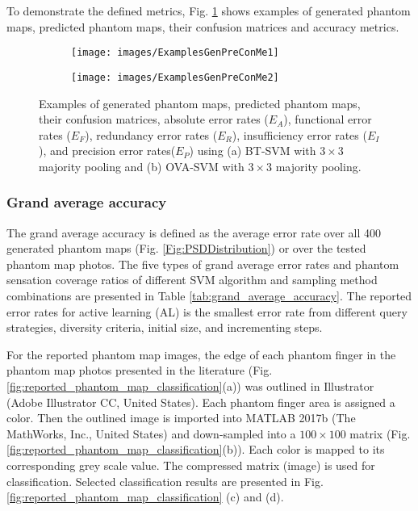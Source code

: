 To demonstrate the defined metrics, Fig. \ref{fig:ExamplesRealPredictedConfMat} shows examples of generated phantom maps, predicted phantom maps, their confusion matrices and accuracy metrics.

\begin{figure}[htbp]
    \centering
    \begin{subfigure}[b]{0.43\textwidth}
        \texttt{[image: images/ExamplesGenPreConMe1]}
        \caption{}
    \end{subfigure}
    \begin{subfigure}[b]{0.43\textwidth}
        \texttt{[image: images/ExamplesGenPreConMe2]}
        \caption{}
    \end{subfigure}
    \caption{Examples of generated phantom maps, predicted phantom maps, their confusion matrices, absolute error rates ($E_A$), functional error rates ($E_F$), redundancy error rates ($E_R$), insufficiency error rates ($E_I$), and precision error rates($E_P$) using (a) BT-SVM with $3 \times 3$ majority pooling and (b) OVA-SVM with $3 \times 3$ majority pooling. }
    \label{fig:ExamplesRealPredictedConfMat}
\end{figure} 
 


\subsubsection{Grand average accuracy}
\label{chap2:subsubsec:grand_average_accuracy}
The grand average accuracy is defined as the average error rate over all 400 generated phantom maps (Fig. \ref{Fig:PSDDistribution}) or over the tested phantom map photos. The five types of grand average error rates and phantom sensation coverage ratios of different SVM algorithm and sampling method combinations are presented in Table \ref{tab:grand_average_accuracy}. The reported error rates for active learning (AL) is the smallest error rate from different query strategies, diversity criteria, initial size, and incrementing steps.  

For the reported phantom map images, the edge of each phantom finger in the phantom map photos presented in the literature (Fig. \ref{fig:reported_phantom_map_classification}(a)) was outlined in Illustrator (Adobe Illustrator CC, United States). Each phantom finger area is assigned a color. Then the outlined image is imported into MATLAB 2017b (The MathWorks, Inc., United States) and down-sampled into a $100 \times 100$ matrix (Fig. \ref{fig:reported_phantom_map_classification}(b)). Each color is mapped to its corresponding grey scale value. The compressed matrix (image) is used for classification. Selected classification results are presented in  Fig. \ref{fig:reported_phantom_map_classification}  (c) and (d). 

